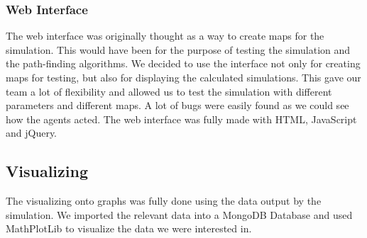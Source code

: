 \subsubsection{Web Interface}
The web interface was originally thought as a way to create maps for the simulation. This would have been for the purpose of testing the simulation and the path-finding algorithms. We decided to use the interface not only for creating maps for testing, but also for displaying the calculated simulations. This gave our team a lot of flexibility and allowed us to test the simulation with different parameters and different maps. A lot of bugs were easily found as we could see how the agents acted. The web interface was fully made with HTML, JavaScript and jQuery.

\subsection{Visualizing}
The visualizing onto graphs was fully done using the data output by the simulation. We imported the relevant data into a MongoDB Database and used MathPlotLib to visualize the data we were interested in.

